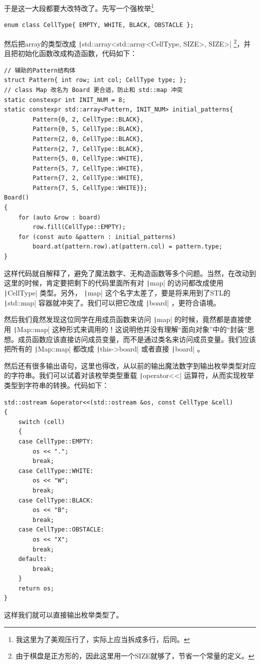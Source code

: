 于是这一大段都要大改特改了。先写一个强枚举\footnote{我这里为了美观压行了，实际上应当拆成多行，后同。}
\begin{verbatim}
enum class CellType{ EMPTY, WHITE, BLACK, OBSTACLE };
\end{verbatim}

然后把array的类型改成 \texttt|std::array<std::array<CellType, SIZE>, SIZE>| \footnote{由于棋盘是正方形的，因此这里用一个SIZE就够了，节省一个常量的定义。}，并且把初始化函数改成构造函数，代码如下：
\begin{verbatim}
// 辅助的Pattern结构体
struct Pattern{ int row; int col; CellType type; };
// class Map 改名为 Board 更合适，防止和 std::map 冲突
static constexpr int INIT_NUM = 8;
static constexpr std::array<Pattern, INIT_NUM> initial_patterns{
        Pattern{0, 2, CellType::BLACK},
        Pattern{0, 5, CellType::BLACK},
        Pattern{2, 0, CellType::BLACK},
        Pattern{2, 7, CellType::BLACK},
        Pattern{5, 0, CellType::WHITE},
        Pattern{5, 7, CellType::WHITE},
        Pattern{7, 2, CellType::WHITE},
        Pattern{7, 5, CellType::WHITE}};
Board()
{
    for (auto &row : board)
        row.fill(CellType::EMPTY);
    for (const auto &pattern : initial_patterns)
        board.at(pattern.row).at(pattern.col) = pattern.type;
}
\end{verbatim}
这样代码就自解释了，避免了魔法数字、无构造函数等多个问题。当然，在改动到这里的时候，肯定要把剩下的代码里面所有对 \texttt|map| 的访问都改成使用 \texttt|CellType| 类型。另外， \texttt|map| 这个名字太差了，要是将来用到了STL的 \texttt|std::map| 容器就冲突了。我们可以把它改成 \texttt|board| ，更符合语境。

然后我们竟然发现这位同学在用成员函数来访问 \texttt|map| 的时候，竟然都是直接使用 \texttt|Map::map| 这种形式来调用的！这说明他并没有理解“面向对象”中的“封装”思想。成员函数应该直接访问成员变量，而不是通过类名来访问成员变量。我们应该把所有的 \texttt|Map::map| 都改成 \texttt|this->board| 或者直接 \texttt|board| 。

然后还有很多输出语句，这里也得改，从以前的输出魔法数字到输出枚举类型对应的字符串。我们可以试着对该枚举类型重载 \texttt|operator<<| 运算符，从而实现枚举类型到字符串的转换。代码如下：
\begin{verbatim}
std::ostream &operator<<(std::ostream &os, const CellType &cell)
{
    switch (cell)
    {
    case CellType::EMPTY:
        os << ".";
        break;
    case CellType::WHITE:
        os << "W";
        break;
    case CellType::BLACK:
        os << "B";
        break;
    case CellType::OBSTACLE:
        os << "X";
        break;
    default:
        break;
    }
    return os;
}
\end{verbatim}
这样我们就可以直接输出枚举类型了。

